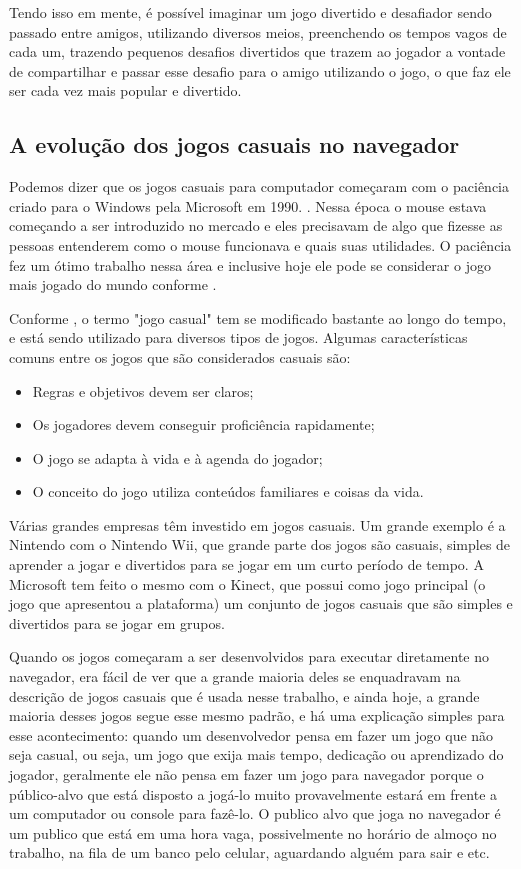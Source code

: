 Tendo isso em mente, é possível imaginar um jogo divertido e desafiador
sendo passado entre amigos, utilizando diversos meios, preenchendo os
tempos vagos de cada um, trazendo pequenos desafios divertidos que
trazem ao jogador a vontade de compartilhar e passar esse desafio para
o amigo utilizando o jogo, o que faz ele ser cada vez mais popular e
divertido.

\subsection{A evolução dos jogos casuais no navegador}

Podemos dizer que os jogos casuais para computador começaram com
o paciência criado para o Windows pela Microsoft em 1990. \cite{trefry2010casual}.
Nessa época o mouse estava começando a ser introduzido no mercado e
eles precisavam de algo que fizesse as pessoas entenderem como o mouse
funcionava e quais suas utilidades. O paciência fez um ótimo trabalho
nessa área e inclusive hoje ele pode se considerar o jogo mais jogado
do mundo conforme .

Conforme , o termo "jogo casual" tem se
modificado bastante ao longo do tempo, e está sendo utilizado para
diversos tipos de jogos. Algumas características comuns entre os jogos
que são considerados casuais são:

\begin{itemize}
    \item Regras e objetivos devem ser claros;
    \item Os jogadores devem conseguir proficiência rapidamente;
    \item O jogo se adapta à vida e à agenda do jogador;
    \item O conceito do jogo utiliza conteúdos familiares e coisas da vida.
\end{itemize}

Várias grandes empresas têm investido em jogos casuais. Um grande
exemplo é a Nintendo com o Nintendo Wii, que grande parte dos jogos
são casuais, simples de aprender a jogar e divertidos para se jogar
em um curto período de tempo.
A Microsoft tem feito o mesmo com o Kinect, que
possui como jogo principal (o jogo que apresentou a plataforma) um
conjunto de jogos casuais que são simples e divertidos para se jogar
em grupos.

Quando os jogos começaram a ser desenvolvidos para executar
diretamente no navegador, era fácil de ver que a grande maioria deles
se enquadravam na descrição de jogos casuais que é usada nesse
trabalho, e ainda hoje, a grande maioria desses jogos segue
esse mesmo padrão, e há uma explicação simples para esse
acontecimento: quando um desenvolvedor pensa em fazer um jogo que
não seja casual, ou seja, um jogo que exija mais tempo, dedicação ou
aprendizado do jogador, geralmente ele não pensa em fazer um jogo para
navegador porque o público-alvo que está disposto a jogá-lo muito
provavelmente estará em frente a um computador ou console para
fazê-lo.
O publico alvo que joga no navegador é um publico que está em uma hora
vaga, possivelmente no horário de almoço no trabalho, na fila de um
banco pelo celular, aguardando alguém para sair e etc.

